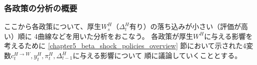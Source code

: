 \subsubsection{各政策の分析の概要}
ここから各政策について、厚生\(W_s^H\)（\(\Delta_t^H\)有り）の落ち込みが小さい（評価が高い）順に
4曲線などを用いた分析をおこなう。
各政策が厚生\(W^H\)に与える影響を考えるために
\ref{chapter5_beta_shock_policies_overview}
節において示された4変数\(c_t^{H \to W},y_t^H,\pi_t^H,\Delta_{t-1}^H\)に与える影響について
順に議論していくこととする。